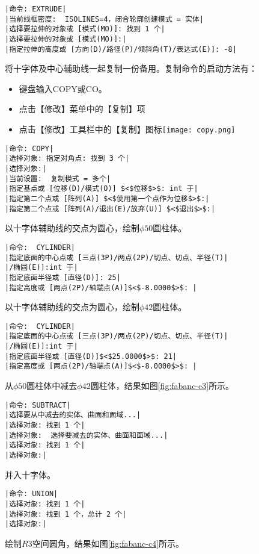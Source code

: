 \begin{procedure}
\begin{lstlisting}
|命令: EXTRUDE|
|当前线框密度:  ISOLINES=4，闭合轮廓创建模式 = 实体|
|选择要拉伸的对象或 [模式(MO)]: 找到 1 个|
|选择要拉伸的对象或 [模式(MO)]:|
|指定拉伸的高度或 [方向(D)/路径(P)/倾斜角(T)/表达式(E)]: -8|
\end{lstlisting}
将十字体及中心辅助线一起复制一份备用。复制命令的启动方法有：
\begin{itemize}
\item 键盘输入COPY或CO。
\item 点击【修改】菜单中的【复制】项
\item 点击【修改】工具栏中的【复制】图标\texttt{[image: copy.png]}
\end{itemize}
\begin{lstlisting}
|命令: COPY|
|选择对象: 指定对角点: 找到 3 个|
|选择对象:|
|当前设置:  复制模式 = 多个|
|指定基点或 [位移(D)/模式(O)] $<$位移$>$: int 于|
|指定第二个点或 [阵列(A)] $<$使用第一个点作为位移$>$:|
|指定第二个点或 [阵列(A)/退出(E)/放弃(U)] $<$退出$>$:|
\end{lstlisting}
\item 以十字体辅助线的交点为圆心，绘制$\phi 50$圆柱体。
\begin{lstlisting}
|命令:  CYLINDER|
|指定底面的中心点或 [三点(3P)/两点(2P)/切点、切点、半径(T)|
|/椭圆(E)]:int 于|
|指定底面半径或 [直径(D)]: 25|
|指定高度或 [两点(2P)/轴端点(A)]$<$-8.0000$>$: |
\end{lstlisting}
\item 以十字体辅助线的交点为圆心，绘制$\phi 42$圆柱体。
\begin{lstlisting}
|命令:  CYLINDER|
|指定底面的中心点或 [三点(3P)/两点(2P)/切点、切点、半径(T)|
|/椭圆(E)]:int 于|
|指定底面半径或 [直径(D)]$<$25.0000$>$: 21|
|指定高度或 [两点(2P)/轴端点(A)]$<$-8.0000$>$: |
\end{lstlisting}
\newpage
\item 从$\phi 50$圆柱体中减去$\phi 42$圆柱体，结果如图\ref{fig:fabanc-c3}所示。
\begin{lstlisting}
|命令: SUBTRACT|
|选择要从中减去的实体、曲面和面域...|
|选择对象: 找到 1 个|
|选择对象:  选择要减去的实体、曲面和面域...|
|选择对象: 找到 1 个|
|选择对象:|
\end{lstlisting}
\item 并入十字体。
\begin{lstlisting}
|命令: UNION|
|选择对象: 找到 1 个|
|选择对象: 找到 1 个，总计 2 个|
|选择对象:|
\end{lstlisting}
\item 绘制$R3$空间圆角，结果如图\ref{fig:fabanc-c4}所示。

\end{procedure}
